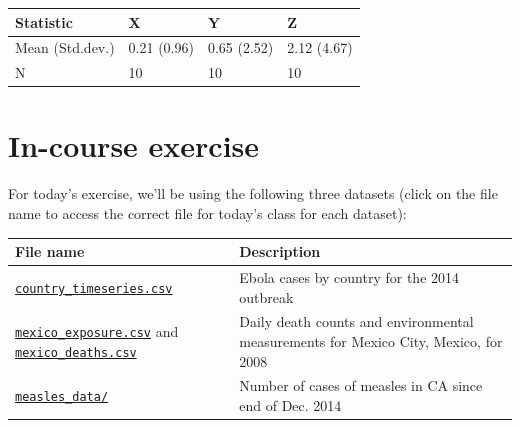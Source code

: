 \documentclass[]{book}
\theoremstyle{definition}
\theoremstyle{definition}
\theoremstyle{definition}
\theoremstyle{remark}
\begin{document}
\begin{tabular}{l|l|l|l}
\hline
Statistic & X & Y & Z\\
\hline
Mean (Std.dev.) & 0.21 (0.96) & 0.65 (2.52) & 2.12 (4.67)\\
\hline
N & 10 & 10 & 10\\
\hline
\end{tabular}

\section{In-course exercise}\label{in-course-exercise-5}

For today's exercise, we'll be using the following three datasets (click
on the file name to access the correct file for today's class for each
dataset):

\begin{longtable}[]{@{}ll@{}}
\toprule
\begin{minipage}[b]{0.27\columnwidth}\raggedright\strut
File name\strut
\end{minipage} & \begin{minipage}[b]{0.63\columnwidth}\raggedright\strut
Description\strut
\end{minipage}\tabularnewline
\midrule
\endhead
\begin{minipage}[t]{0.27\columnwidth}\raggedright\strut
\href{https://github.com/geanders/RProgrammingForResearch/raw/master/data/country_timeseries.csv}{\texttt{country\_timeseries.csv}}\strut
\end{minipage} & \begin{minipage}[t]{0.63\columnwidth}\raggedright\strut
Ebola cases by country for the 2014 outbreak\strut
\end{minipage}\tabularnewline
\begin{minipage}[t]{0.27\columnwidth}\raggedright\strut
\href{https://github.com/geanders/RProgrammingForResearch/raw/master/data/mexico_exposure.csv}{\texttt{mexico\_exposure.csv}}
and
\href{https://github.com/geanders/RProgrammingForResearch/raw/master/data/mexico_deaths.csv}{\texttt{mexico\_deaths.csv}}\strut
\end{minipage} & \begin{minipage}[t]{0.63\columnwidth}\raggedright\strut
Daily death counts and environmental measurements for Mexico City,
Mexico, for 2008\strut
\end{minipage}\tabularnewline
\begin{minipage}[t]{0.27\columnwidth}\raggedright\strut
\href{https://github.com/geanders/RProgrammingForResearch/tree/master/data/measles_data}{\texttt{measles\_data/}}\strut
\end{minipage} & \begin{minipage}[t]{0.63\columnwidth}\raggedright\strut
Number of cases of measles in CA since end of Dec. 2014\strut
\end{minipage}\tabularnewline
\bottomrule
\end{longtable}
\end{document}
